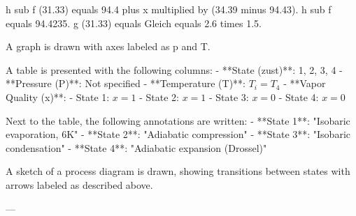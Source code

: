 h sub f (31.33) equals 94.4 plus x multiplied by (34.39 minus 94.43).  
h sub f equals 94.4235.  
g (31.33) equals Gleich equals 2.6 times 1.5.  

A graph is drawn with axes labeled as p and T.

A table is presented with the following columns:  
- **State (zust)**: 1, 2, 3, 4  
- **Pressure (P)**: Not specified  
- **Temperature (T)**: \( T_i = T_4 \)  
- **Vapor Quality (x)**:  
  - State 1: \( x = 1 \)  
  - State 2: \( x = 1 \)  
  - State 3: \( x = 0 \)  
  - State 4: \( x = 0 \)  

Next to the table, the following annotations are written:  
- **State 1**: "Isobaric evaporation, 6K"  
- **State 2**: "Adiabatic compression"  
- **State 3**: "Isobaric condensation"  
- **State 4**: "Adiabatic expansion (Drossel)"  

A sketch of a process diagram is drawn, showing transitions between states with arrows labeled as described above.

---